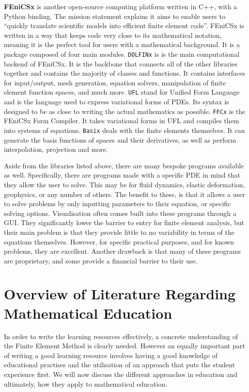 \textbf{FEniCSx} \cite{fenics} is another open-source computing platform written in C++, with a Python binding. The mission statement explains it aims to enable users to ``quickly translate scientific models into efficient finite element code''. FEniCSx is written in a way that keeps code very close to its mathematical notation, meaning it is the perfect tool for users with a mathematical background. It is a package composed of four main modules. \texttt{DOLFINx} is is the main computational backend of FEniCSx. It is the backbone that connects all of the other libraries together and contains the majority of classes and functions. It contains interfaces for input/output, mesh generation, equation solvers, manipulation of finite element function spaces, and much more. \texttt{UFL} stand for Unified Form Language and is the language used to express variational forms of PDEs. Its syntax is designed to be as close to writing the actual mathematics as possible. \texttt{FFCx} is the FEniCSx Form Compiler. It takes variational forms in UFL and compiles them into systems of equations. \texttt{Basix} deals with the finite elements themselves. It can generate the basis functions of spaces and their derivatives, as well as perform interpolation, projection and more.

\pagebreak

Aside from the libraries listed above, there are many bespoke programs available as well. Specifically, there are programs made with a specific PDE in mind that they allow the user to solve. This may be for fluid dynamics, elastic deformation, geophysics, or any number of others. The benefit to these, is that it allows a user to solve problems by only inputting parameters to their equation, or specific solving options. Visualisation often comes built into these programs through a GUI. They significantly lower the barrier to entry for finite element analysis, but their main problem is that they provide little to no variability in terms of the equations themselves. However, for specific practical purposes, and for known problems, they are excellent. Another drawback is that many of these programs are proprietary, and some provide a financial barrier to their use.

\section{Overview of Literature Regarding Mathematical Education} \label{section:overview-of-literature}

In order to write the learning resources effectively, a concrete understanding of the Finite Element Method is clearly needed. However an equally important part of writing a good learning resource involves having a good knowledge of educational practises and the utilisation of an approach that puts the student experience first. We will now discuss the different approaches in education and ultimately, how they apply to mathematical education.

